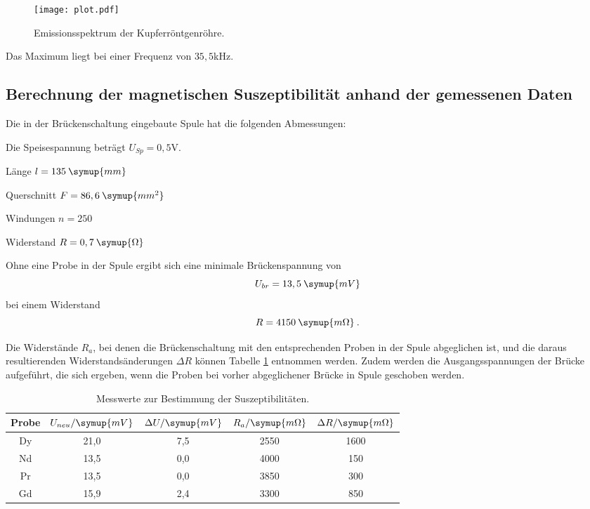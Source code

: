 \begin{figure}[H]
  \centering
  \texttt{[image: plot.pdf]}
  \caption{Emissionsspektrum der Kupferröntgenröhre.}
  \label{fig:plot}
\end{figure}

Das Maximum liegt bei einer Frequenz von $35,5$kHz.


\subsection{Berechnung der magnetischen Suszeptibilität anhand der gemessenen Daten}
Die in der Brückenschaltung eingebaute Spule hat die folgenden Abmessungen:

Die Speisespannung beträgt $U_{Sp} = 0,5$V.

Länge $l = 135 \: \symup{mm}$

Querschnitt $F = 86,6 \: \symup{mm^2}$

Windungen $n = 250$

Widerstand $R = 0,7 \: \symup{\Omega}$

Ohne eine Probe in der Spule ergibt sich eine minimale Brückenspannung von
\begin{equation*}
  U_{br} = 13,5 \: \symup{mV}
\end{equation*}
bei einem Widerstand
\begin{equation*}
  R = 4150 \: \symup{m\Omega} \: .
\end{equation*}

Die Widerstände $R_a$, bei denen die Brückenschaltung mit den entsprechenden Proben
in der Spule abgeglichen ist, und die daraus resultierenden Widerstandsänderungen $\Delta R$ können
Tabelle \ref{tab:Widerstand} entnommen werden. Zudem werden die Ausgangsspannungen der Brücke aufgeführt,
die sich ergeben, wenn die Proben bei vorher abgeglichener Brücke in Spule geschoben werden.
\begin{table}[H]
  \centering
  \caption{Messwerte zur Bestimmung der Suszeptibilitäten.}
  \label{tab:Widerstand}
  \begin{tabular}{c c c c c}
    \toprule
    Probe & $U_{neu} / \symup{mV}$ & $\Delta U / \symup{mV}$ &  $R_a / \symup{m\Omega}$   & $\Delta R / \symup{m\Omega}$  \\
    \midrule
    Dy & 21,0 & 7,5 & 2550 & 1600 \\
    Nd & 13,5 & 0,0 & 4000 & 150 \\
    Pr & 13,5 & 0,0 & 3850 & 300 \\
    Gd & 15,9 & 2,4 & 3300 & 850 \\
    \bottomrule
  \end{tabular}
\end{table}

